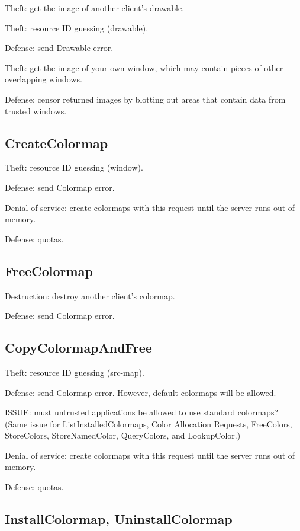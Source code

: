 Theft: get the image of another client's drawable.

Theft: resource ID guessing (drawable).

Defense: send Drawable error.

Theft: get the image of your own window, which may contain pieces of
other overlapping windows.

Defense: censor returned images by blotting out areas that contain
data from trusted windows.



\subsection{CreateColormap}

Theft: resource ID guessing (window).

Defense: send Colormap error.

Denial of service: create colormaps with this request until the server
runs out of memory.

Defense: quotas.



\subsection{FreeColormap}

Destruction: destroy another client's colormap.

Defense: send Colormap error.



\subsection{CopyColormapAndFree}

Theft: resource ID guessing (src-map).

Defense: send Colormap error.  However, default colormaps will be
allowed.

ISSUE: must untrusted applications be allowed to use standard colormaps?
(Same issue for ListInstalledColormaps, Color Allocation Requests,
FreeColors, StoreColors, StoreNamedColor, QueryColors, and LookupColor.)

Denial of service: create colormaps with this request until the server
runs out of memory.

Defense: quotas.



\subsection{InstallColormap, UninstallColormap}

